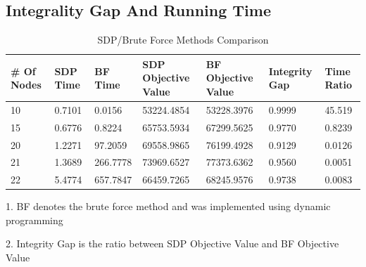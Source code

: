 \documentclass{article}
\begin{document}
\subsection{Integrality Gap And Running Time}
\begin{table}[!ht]
\begin{threeparttable}
\caption{SDP/Brute Force Methods Comparison}
\begin{tabular}{|l|l|l|l|l|l|l|}
\hline
\# Of Nodes & SDP  Time & BF Time  & SDP Objective Value & BF Objective Value & Integrity Gap & Time Ratio \\
\hline
10          & 0.7101    & 0.0156   & 53224.4854          & 53228.3976         & 0.9999        & 45.519     \\
15          & 0.6776    & 0.8224   & 65753.5934          & 67299.5625         & 0.9770        & 0.8239     \\
20          & 1.2271    & 97.2059  & 69558.9865          & 76199.4928         & 0.9129        & 0.0126     \\
21          & 1.3689    & 266.7778 & 73969.6527          & 77373.6362         & 0.9560        & 0.0051     \\
22          & 5.4774    & 657.7847 & 66459.7265          & 68245.9576         & 0.9738        & 0.0083     \\
 \hline
\end{tabular}
\begin{tablenotes}
      \small
      \item 1. BF denotes the brute force method and was implemented using dynamic programming
      \item 2. Integrity Gap is the ratio between SDP Objective Value and BF Objective Value
    \end{tablenotes}
\end{threeparttable}
\end{table}
\end{document}

